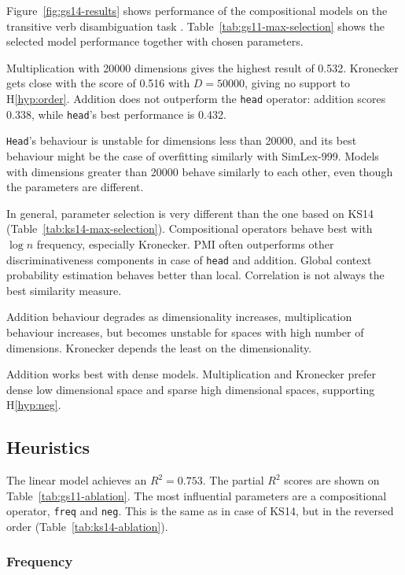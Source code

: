 Figure~\ref{fig:gs14-results} shows performance of the compositional models on the transitive verb disambiguation task \cite{Grefenstette:2011:ESC:2145432.2145580}. Table~\ref{tab:gs11-max-selection} shows the selected model performance together with chosen parameters.

Multiplication with 20000 dimensions gives the highest result of 0.532. Kronecker gets close with the score of 0.516 with $D = 50000$, giving no support to H\ref{hyp:order}. Addition does not outperform the \texttt{head} operator: addition scores 0.338, while \texttt{head}'s best performance is 0.432.

\texttt{Head}'s behaviour is unstable for dimensions less than 20000, and its best behaviour might be the case of overfitting similarly with SimLex-999. Models with dimensions greater than 20000 behave similarly to each other, even though the parameters are different.

In general, parameter selection is very different than the one based on KS14 (Table~\ref{tab:ks14-max-selection}). Compositional operators behave best with $\log n$ frequency, especially Kronecker. PMI often outperforms other discriminativeness components in case of \texttt{head} and addition. Global context probability estimation behaves better than local. Correlation is not always the best similarity measure.

Addition behaviour degrades as dimensionality increases, multiplication behaviour increases, but becomes unstable for spaces with high number of dimensions. Kronecker depends the least on the dimensionality.

Addition works best with dense models. Multiplication and Kronecker prefer dense low dimensional space and sparse high dimensional spaces, supporting H\ref{hyp:neg}.

\subsection{Heuristics}
\label{sec:heuristics-gs11}



The linear model achieves an $R^2 = 0.753$. The partial $R^2$ scores are shown on Table~\ref{tab:gs11-ablation}. The most influential parameters are a compositional operator, \texttt{freq} and \texttt{neg}. This is the same as in case of KS14, but in the reversed order (Table~\ref{tab:ks14-ablation}).


\subsubsection{Frequency}

